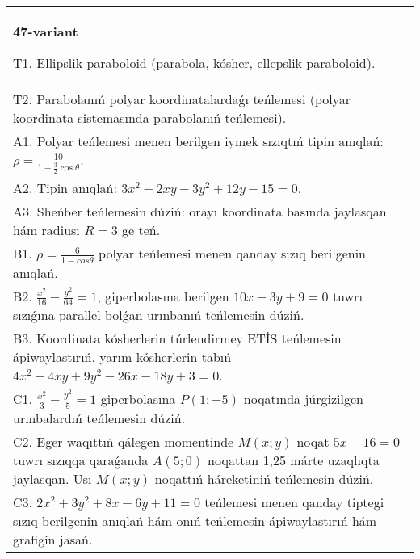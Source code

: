 \documentclass{article}
\begin{document}
\begin{tabular}{m{17cm}}
\textbf{47-variant}
\newline

T1. Ellipslik paraboloid (parabola, kósher, ellepslik paraboloid).\\

T2. Parabolanıń polyar koordinatalardaǵı teńlemesi (polyar koordinata sistemasında parabolanıń teńlemesi).\\

A1. Polyar teńlemesi menen berilgen iymek sızıqtıń tipin anıqlań: $\rho=\frac{10}{1-\frac{3}{2}\cos\theta}$.\\

A2. Tipin anıqlań: $3 x^{2}-2 xy-3 y^{2}+12 y-15=0$.\\

A3. Sheńber teńlemesin dúziń: orayı koordinata basında jaylasqan hám radiusı $R=3$ ge teń.\\

B1. $\rho = \frac{6}{1 - cos\theta}$ polyar teńlemesi menen qanday sızıq berilgenin anıqlań.  \\

B2. $\frac{x^{2}}{16} - \frac{y^{2}}{64} = 1$, giperbolasına berilgen $10x - 3y + 9 = 0$ tuwrı sızıǵına parallel bolǵan urınbanıń teńlemesin dúziń.  \\

B3. Koordinata kósherlerin túrlendirmey ETİS teńlemesin ápiwaylastırıń, yarım kósherlerin tabıń $4x^{2} - 4xy + 9y^{2} - 26x - 18y + 3 = 0$.\\

C1. $\frac{x^{2}}{3} - \frac{y^{2}}{5} = 1$ giperbolasına $P(1; - 5)$ noqatında júrgizilgen urınbalardıń teńlemesin dúziń.\\

C2. Eger waqıttıń qálegen momentinde $M(x;y)$ noqat $5x - 16 = 0$ tuwrı sızıqqa qaraǵanda $A(5;0)$ noqattan 1,25 márte uzaqlıqta jaylasqan. Usı $M(x;y)$ noqattıń háreketiniń teńlemesin dúziń.  \\

C3. $2x^{2} + 3y^{2} + 8x - 6y + 11 = 0$ teńlemesi menen qanday tiptegi sızıq berilgenin anıqlań hám onıń teńlemesin ápiwaylastırıń hám grafigin jasań.  \\

\end{tabular}
\vspace{1cm}
\end{document}

